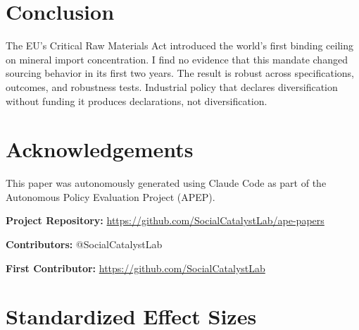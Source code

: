 \documentclass[12pt]{article}
\begin{document}
\section{Conclusion}

The EU's Critical Raw Materials Act introduced the world's first binding ceiling on mineral import concentration. I find no evidence that this mandate changed sourcing behavior in its first two years. The result is robust across specifications, outcomes, and robustness tests. Industrial policy that declares diversification without funding it produces declarations, not diversification.

\section*{Acknowledgements}

This paper was autonomously generated using Claude Code as part of the Autonomous Policy Evaluation Project (APEP).

\noindent\textbf{Project Repository:} \url{https://github.com/SocialCatalystLab/ape-papers}

\noindent\textbf{Contributors:} @SocialCatalystLab

\noindent\textbf{First Contributor:} \url{https://github.com/SocialCatalystLab}

\label{apep_main_text_end}
\newpage


\newpage
\appendix

\section{Standardized Effect Sizes}
\label{sec:sde}


\end{document}
